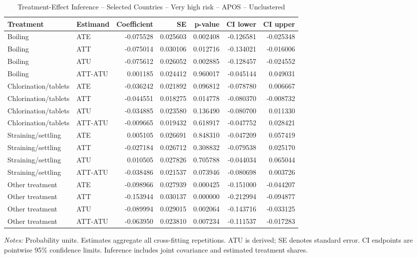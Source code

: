 \begin{table}[htbp]
\centering
\caption{Treatment-Effect Inference -- Selected Countries -- Very high risk -- APOS -- Unclustered}
\label{tab:inference-VeryHighRiskHome-APOS-iid-selected-countries}
\scriptsize
\begin{adjustbox}{max width=\linewidth}
\begin{tabular}{llrrrrr}
\toprule
Treatment & Estimand & Coefficient & SE & p-value & CI lower & CI upper \\
\midrule
Boiling & ATE & -0.075528 & 0.025603 & 0.002408 & -0.126581 & -0.025348 \\
Boiling & ATT & -0.075014 & 0.030106 & 0.012716 & -0.134021 & -0.016006 \\
Boiling & ATU & -0.075612 & 0.026052 & 0.002885 & -0.128457 & -0.024552 \\
Boiling & ATT-ATU & 0.001185 & 0.024412 & 0.960017 & -0.045144 & 0.049031 \\
Chlorination/tablets & ATE & -0.036242 & 0.021892 & 0.096812 & -0.078780 & 0.006667 \\
Chlorination/tablets & ATT & -0.044551 & 0.018275 & 0.014778 & -0.080370 & -0.008732 \\
Chlorination/tablets & ATU & -0.034885 & 0.023580 & 0.136490 & -0.080700 & 0.011330 \\
Chlorination/tablets & ATT-ATU & -0.009665 & 0.019432 & 0.618917 & -0.047752 & 0.028421 \\
Straining/settling & ATE & 0.005105 & 0.026691 & 0.848310 & -0.047209 & 0.057419 \\
Straining/settling & ATT & -0.027184 & 0.026712 & 0.308832 & -0.079538 & 0.025170 \\
Straining/settling & ATU & 0.010505 & 0.027826 & 0.705788 & -0.044034 & 0.065044 \\
Straining/settling & ATT-ATU & -0.038486 & 0.021537 & 0.073946 & -0.080698 & 0.003726 \\
Other treatment & ATE & -0.098966 & 0.027939 & 0.000425 & -0.151000 & -0.044207 \\
Other treatment & ATT & -0.153944 & 0.030137 & 0.000000 & -0.212994 & -0.094877 \\
Other treatment & ATU & -0.089994 & 0.029015 & 0.002064 & -0.143716 & -0.033125 \\
Other treatment & ATT-ATU & -0.063950 & 0.023810 & 0.007234 & -0.111537 & -0.017283 \\
\bottomrule
\end{tabular}

\end{adjustbox}
\par\smallskip
\begin{minipage}{\linewidth}\scriptsize \textit{Notes:} Probability units. Estimates aggregate all cross-fitting repetitions. ATU is derived; SE denotes standard error. CI endpoints are pointwise 95\% confidence limits. Inference includes joint covariance and estimated treatment shares. \end{minipage}
\end{table}

